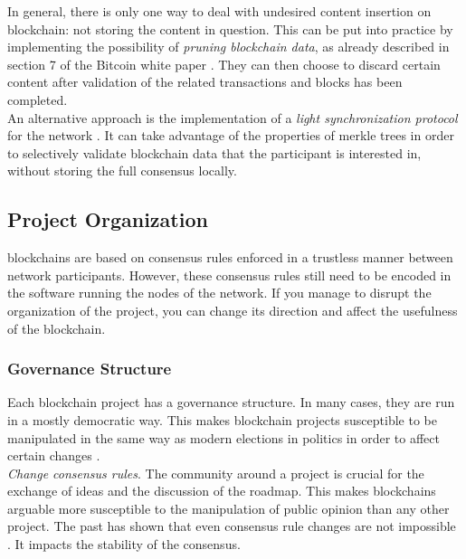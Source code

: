 \documentclass[12pt,a4paper]{article}
\begin{document}
In general, there is only one way to deal with undesired content insertion on \gls{blockchain}: not storing the content in question. This can be put into practice by implementing the possibility of \textit{pruning blockchain data}, as already described in section 7 of the Bitcoin white paper \cite{bitcoin}. They can then choose to discard certain content after validation of the related \glspl{transaction} and \glspl{block} has been completed.\\

An alternative approach is the implementation of a \textit{light synchronization protocol} for the network \cite{light}. It can take advantage of the properties of merkle trees in order to selectively validate blockchain data that the participant is interested in, without storing the full \gls{consensus} locally.\\

\subsection{Project Organization}

\Glspl{blockchain} are based on consensus rules enforced in a trustless manner between network participants. However, these consensus rules still need to be encoded in the software running the nodes of the network. If you manage to disrupt the organization of the project, you can change its direction and affect the usefulness of the \gls{blockchain}.\\

\subsubsection{Governance Structure}

Each blockchain project has a governance structure. In many cases, they are run in a mostly democratic way. This makes blockchain projects susceptible to be manipulated in the same way as modern elections in politics in order to affect certain changes \cite{fakenews}.\\

\textit{Change consensus rules}. The community around a project is crucial for the exchange of ideas and the discussion of the roadmap. This makes \glspl{blockchain} arguable more susceptible to the manipulation of public opinion than any other project. The past has shown that even consensus rule changes are not impossible \cite{forks}. It impacts the stability of the \gls{consensus}.\\
\end{document}
